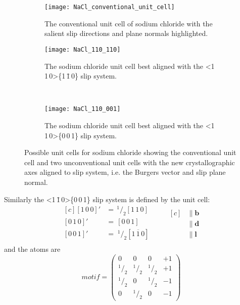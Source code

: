 \begin{figure}
\centering


    \begin{subfigure}{0.55\textwidth}
    \centering
    \texttt{[image: NaCl\_conventional\_unit\_cell]}
    \caption{The conventional unit cell of sodium chloride with the salient slip directions and plane normals highlighted. \label{fig:NaCl_conventional_cell_slip_system_marked}}
    \end{subfigure}

    \begin{subfigure}{0.4\textwidth}
    \centering
    \texttt{[image: NaCl\_110\_110]}
    \caption{The sodium chloride unit cell best aligned with the <1\,1\,0>\{1\,\={1}\,0\} slip system. \label{fig:NaCl_110_110_unit_cell}}
    \end{subfigure}
    ~
    \begin{subfigure}{0.4\textwidth}
    \centering
    \texttt{[image: NaCl\_110\_001]}
    \caption{The sodium chloride unit cell best aligned with the <1\,1\,0>\{0\,0\,1\} slip system. \label{fig:NaCl_110_001_unit_cell}}
    \end{subfigure}

\caption[Unconventional unit cells of rock salt to build a dislocation.]{Possible unit cells for sodium chloride showing the conventional unit cell and two unconventional unit cells with the new crystallographic axes aligned to slip system, i.e. the Burgers vector and slip plane normal.\label{fig:unconventional_NaCl_unit_cells}}
\end{figure}






Similarly the  <1\,\={1}\,0>\{0\,0\,1\} slip system is defined by the unit cell:
\begin{equation*}
\begin{aligned}[c]
 {[1\,0\,0]}' &=\, ^{1}\!/_{2} [1\,1\,0] \\
 {[0\,1\,0]}' &=\,  [0\,0\,1] \\
 {[0\,0\,1]}' &=\; ^{1}\!/_{2} [1\,\overline{1}\,0] \\
\end{aligned}
\qquad
\begin{aligned}[c]
&\parallel \mathbf{b} \\
&\parallel \mathbf{d} \\
&\parallel \mathbf{l}
\end{aligned}
\end{equation*}
and the atoms are
$$
motif = \begin{pmatrix}
0 & 0 & 0 & +1 \\
^{1}\!/_{2} & ^{1}\!/_{2} & ^{1}\!/_{2} & +1 \\
^{1}\!/_{2} & 0 & ^{1}\!/_{2} & -1 \\
0 & ^{1}\!/_{2} & 0 & -1
\end{pmatrix}
$$



